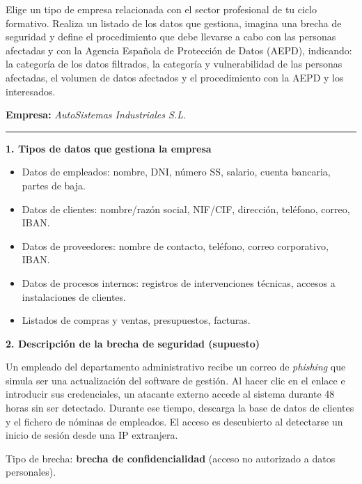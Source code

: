 {
	Elige un tipo de empresa relacionada con el sector profesional de tu ciclo formativo. Realiza
	un listado de los datos que gestiona, imagina una brecha de seguridad y define el procedimiento
	que debe llevarse a cabo con las personas afectadas y con la Agencia Española de Protección
	de Datos (AEPD), indicando: la categoría de los datos filtrados, la categoría y vulnerabilidad
	de las personas afectadas, el volumen de datos afectados y el procedimiento con la AEPD y los
	interesados.
}

\begin{solution}

	\textbf{Empresa:} \textit{AutoSistemas Industriales S.L.}

	\medskip
	\hrule
	\medskip

	\textbf{1. Tipos de datos que gestiona la empresa}

	\begin{itemize}
		\item Datos de empleados: nombre, DNI, número SS, salario, cuenta bancaria, partes de baja.
		\item Datos de clientes: nombre/razón social, NIF/CIF, dirección, teléfono, correo, IBAN.
		\item Datos de proveedores: nombre de contacto, teléfono, correo corporativo, IBAN.
		\item Datos de procesos internos: registros de intervenciones técnicas, accesos a
		      instalaciones de clientes.
		\item Listados de compras y ventas, presupuestos, facturas.
	\end{itemize}

	\medskip

	\textbf{2. Descripción de la brecha de seguridad (supuesto)}

	Un empleado del departamento administrativo recibe un correo de \textit{phishing} que simula ser
	una actualización del software de gestión. Al hacer clic en el enlace e introducir sus
	credenciales, un atacante externo accede al sistema durante 48 horas sin ser detectado.
	Durante ese tiempo, descarga la base de datos de clientes y el fichero de nóminas de empleados.
	El acceso es descubierto al detectarse un inicio de sesión desde una IP extranjera.

	Tipo de brecha: \textbf{brecha de confidencialidad} (acceso no autorizado a datos personales).


\end{solution}
